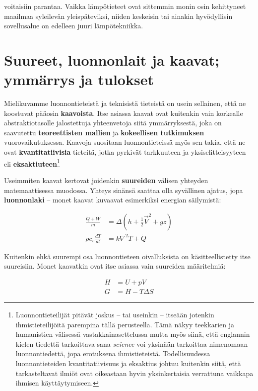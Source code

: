 \documentclass[12pt,a4paper,finnish]{book}
\begin{document}
voitaisiin parantaa. Vaikka lämpötieteet ovat sittemmin monin osin kehittyneet maailmaa syleilevän yleispäteviksi, 
niiden keskeisin tai ainakin hyvödyllisin sovellusalue on edelleen juuri lämpötekniikka.

\section{Suureet, luonnonlait ja kaavat; ymmärrys ja tulokset} %

Mielikuvamme luonnontieteistä ja teknisistä tieteistä on usein sellainen, että ne koostuvat pääosin \textbf{kaavoista}. 
Itse asiassa kaavat ovat kuitenkin vain korkealle abstraktiotasolle jalostettuja yhteenvetoja siitä ymmärryksestä, 
joka on saavutettu \textbf{teoreettisten mallien} ja \textbf{kokeellisen tutkimuksen} vuorovaikutuksessa.
Kaavoja suositaan luonnontieteissä myös sen takia, että ne ovat \textbf{kvantitatiivisia} tieteitä, jotka 
pyrkivät tarkkuuteen ja yksiselitteisyyteen eli \textbf{eksaktiuteen}\footnote{Luonnontieteilijät pitävät 
joskus -- tai useinkin -- itseään jotenkin ihmistieteilijöitä parempina tällä perusteella. Tämä näkyy 
teekkarien ja humanistien välisessä vastakkainasettelussa mutta myös siinä, että englannin kielen tiedettä 
tarkoittava sana \textit{science} voi yksinään tarkoittaa nimenomaan luonnontiedettä, jopa erotuksena 
ihmistieteistä. Todellisuudessa luonnontieteiden kvantitatiivisuus ja eksaktius johtuu kuitenkin siitä, että 
tarkasteltavat ilmiöt ovat oikeastaan hyvin yksinkertaisia verrattuna vaikkapa ihmisen käyttäytymiseen.}

Useimmiten kaavat kertovat joidenkin \textbf{suureiden} välisen yhteyden matemaattisessa muodossa. Yhteys sinänsä 
saattaa olla syvällinen ajatus, jopa \textbf{luonnonlaki} -- monet kaavat kuvaavat esimerkiksi energian säilymistä:

\begin{align}
 \frac{\dot{Q} + \dot{W}}{\dot{m}} &= \Delta\left(h + \frac{1}{2}\vec{V}^2 + gz\right)\\
 \rho c_v\frac{dT}{dt} &= k\nabla^2T + \dot{Q}
\end{align}

Kuitenkin ehkä suurempi osa luonnontieteen oivalluksista on käsitteellistetty itse suureisiin. Monet kaavatkin 
ovat itse asiassa vain suureiden määritelmiä:

\begin{align}
 H &= U + pV\\
 G &= H - T\Delta S 
\end{align}
\end{document}
